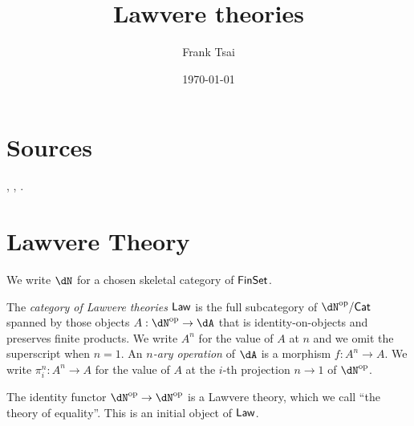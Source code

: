 \documentclass{zett}
\title{Lawvere theories}
\author{Frank Tsai}
\date{\today}
\begin{document}
\maketitle
\tableofcontents

\section{Sources}
\label{sec:sources}

\cite{borger91:generators}, \cite{lawvere63:functsem}, \cite{adamek10:algebraic}.

\section{Lawvere Theory}
\label{sec:lawvere-theory}

\begin{node}
  We write $\dN$ for a chosen skeletal category of $\mathsf{FinSet}$.
\end{node}

\begin{defn}
  The \emph{category of Lawvere theories} $\mathsf{Law}$ is the full subcategory of $\dN\op/\CCat$ spanned by those objects $A : \dN\op \to \dA$ that is identity-on-objects and preserves finite products.
  We write $A^{n}$ for the value of $A$ at $n$ and we omit the superscript when $n = 1$.
  An \emph{$n$-ary operation} of $\dA$ is a morphism $f : A^{n} \to A$.
  We write $\pi^{n}_{i} : A^{n} \to A$ for the value of $A$ at the $i$-th projection $n \to 1$ of $\dN\op$.
\end{defn}

\begin{eg}
  The identity functor $\dN\op \to \dN\op$ is a Lawvere theory, which we call ``the theory of equality''.
  This is an initial object of $\mathsf{Law}$.
\end{eg}
\end{document}
